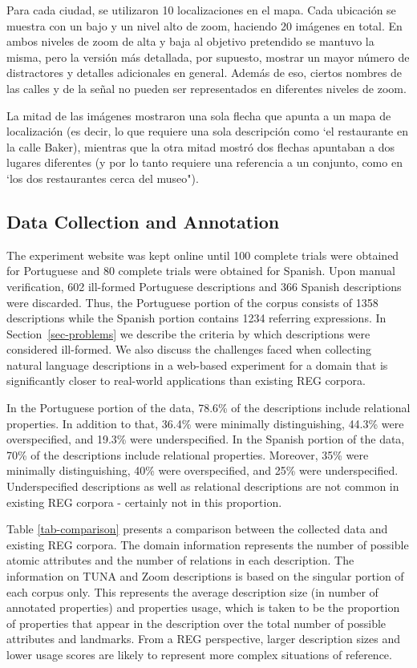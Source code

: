 Para cada ciudad, se utilizaron 10 localizaciones en el mapa. Cada ubicaci\'on se muestra con un bajo y un nivel alto de zoom, haciendo 20 im\'agenes en total. En ambos niveles de zoom de alta y baja al objetivo pretendido se mantuvo la misma, pero la versi\'on m\'as detallada, por supuesto, mostrar un mayor n\'umero de distractores y detalles adicionales en general. Adem\'as de eso, ciertos nombres de las calles y de la se\~nal no pueden ser representados en diferentes niveles de zoom.

La mitad de las im\'agenes mostraron una sola flecha que apunta a un mapa de localizaci\'on (es decir, lo que requiere una sola descripci\'on como `el restaurante en la calle Baker), mientras que la otra mitad mostr\'o dos flechas apuntaban a dos lugares diferentes (y por lo tanto requiere una referencia a un conjunto, como en `los dos restaurantes cerca del museo").
\subsection{Data Collection and Annotation}
\label{sec-annotation}

The experiment website was kept online until 100 complete trials were obtained for Portuguese and 80 complete trials were obtained for Spanish. Upon manual verification, 602 ill-formed Portuguese descriptions and 366 Spanish descriptions were discarded. Thus, the Portuguese portion of the corpus consists of 1358 descriptions while the Spanish portion contains 1234 referring expressions. In Section~\ref{sec-problems} we describe the criteria by which descriptions were considered ill-formed. We also discuss the challenges faced when collecting natural language descriptions in a web-based experiment for a domain that is significantly closer to real-world applications than existing REG corpora. 

In the Portuguese portion of the data, 78.6\% of the descriptions include relational properties. In addition to that, 36.4\% were minimally distinguishing, 44.3\% were overspecified, and  19.3\% were underspecified. In the Spanish portion of the data, 70\% of the descriptions include relational properties. Moreover, 35\% were minimally distinguishing, 40\% were overspecified, and 25\% were underspecified. Underspecified descriptions as well as relational descriptions are not common in existing REG corpora - certainly not in this proportion.  

Table \ref{tab-comparison} presents a comparison between the collected data and existing REG corpora. The domain information represents the number of possible atomic attributes and the number of relations in each description. The information on TUNA and Zoom descriptions is based on the singular portion of each corpus only. This represents the average description size (in number of annotated properties) and properties usage, which is taken to be  the proportion of properties that appear in the description over the total number of possible attributes and landmarks. From a REG perspective, larger description sizes and lower usage scores are likely to represent more complex situations of reference.


